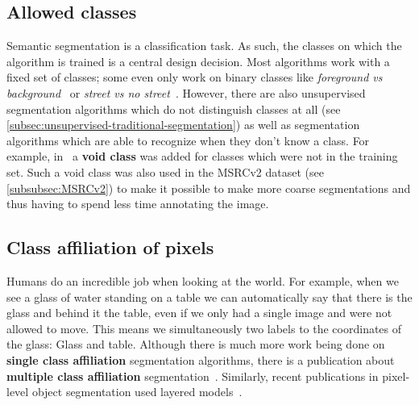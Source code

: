 \documentclass[technote,a4paper,leqno]{IEEEtran}
\begin{document}
\subsection{Allowed classes}\label{subsec:allowed-classes}
Semantic segmentation is a classification task. As such, the classes on which
the algorithm is trained is a central design decision.
Most algorithms work with a fixed set of classes; some even only work on binary
classes like \textit{foreground vs
background}~\cite{4228537,carreira2010constrained} or \textit{street vs no
street}~\cite{bittel2015pixel}.
However, there are also unsupervised segmentation algorithms which do not
distinguish classes at all (see
\cref{subsec:unsupervised-traditional-segmentation}) as well as segmentation
algorithms which are able to recognize when they don't know a class. For
example, in~\cite{gould2008multi} a
\textbf{void class} was added for classes which were not in the training set.
Such a void class was also used in the MSRCv2 dataset (see
\cref{subsubsec:MSRCv2}) to make it possible to make more coarse segmentations
and thus having to spend less time annotating the image.
\subsection{Class affiliation of pixels}\label{subsec:class-affiliation}
Humans do an incredible job when looking at the world. For example, when we see
a glass of water standing on a table we can automatically say that there is the
glass and behind it the table, even if we only had a single image and were not
allowed to move. This means we simultaneously two labels to the coordinates of
the glass: Glass and table. Although there is much more work being done on
\textbf{single class affiliation} segmentation algorithms, there is a
publication about \textbf{multiple class affiliation}
segmentation~\cite{levin2008spectral}. Similarly, recent publications in
pixel-level object segmentation used layered models~\cite{yang2012layered}.
\goodbreak
\end{document}
